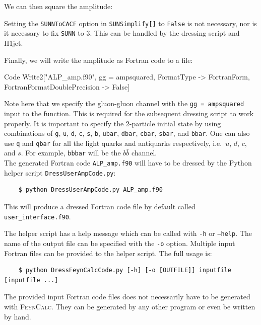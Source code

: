 \documentclass[12pt,a4wide]{article}
\begin{document}
We can then square the amplitude: 
Setting the \texttt{SUNNToCACF} option in \texttt{SUNSimplify[]} to \texttt{False} is not necessary, nor is it necessary to fix \texttt{SUNN} to $3$. This can be handled by the dressing script and H1jet. 

Finally, we will write the amplitude as Fortran code to a file: 
\begin{mmaCell}{Code}
Write2["ALP_amp.f90", gg = ampsquared, FormatType -> FortranForm, FortranFormatDoublePrecision -> False] 
\end{mmaCell}
Note here that we specify the gluon-gluon channel with the \texttt{gg = ampsquared} input to the function. This is required for the subsequent dressing script to work properly. It is important to specify the $2$-particle initial state by using combinations of \texttt{g}, \texttt{u}, \texttt{d}, \texttt{c}, \texttt{s}, \texttt{b}, \texttt{ubar}, \texttt{dbar}, \texttt{cbar}, \texttt{sbar}, and \texttt{bbar}. One can also use \texttt{q} and \texttt{qbar} for all the light quarks and antiquarks respectively, i.e.\ $u$, $d$, $c$, and $s$. For example, \texttt{bbbar} will be the $b\bar{b}$ channel. \\ 

The generated Fortran code \texttt{ALP\_amp.f90} will have to be dressed by the Python helper script \texttt{DressUserAmpCode.py}: 
\begin{lstlisting}
	$ python DressUserAmpCode.py ALP_amp.f90 
\end{lstlisting}
This will produce a dressed Fortran code file by default called \texttt{user\_interface.f90}. 

The helper script has a help message which can be called with \texttt{-h} or \texttt{--help}. The name of the output file can be specified with the \texttt{-o} option. Multiple input Fortran files can be provided to the helper script. The full usage is: 
\begin{lstlisting}
	$ python DressFeynCalcCode.py [-h] [-o [OUTFILE]] inputfile [inputfile ...] 
\end{lstlisting}
The provided input Fortran code files does not necessarily have to be generated with \textsc{FeynCalc}. They can be generated by any other program or even be written by hand. \\ 
\end{document}
